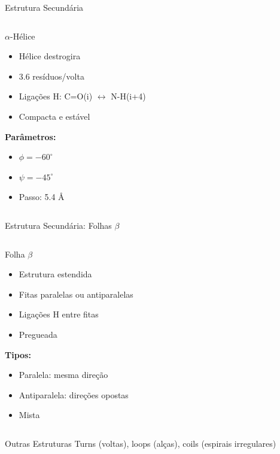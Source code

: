 \begin{frame}[allowframebreaks]{Estrutura Secundária}
\begin{columns}
\begin{block}{$\alpha$-Hélice}
\begin{itemize}
    \item Hélice destrogira
    \item 3.6 resíduos/volta
    \item Ligações H: C=O(i) $\leftrightarrow$ N-H(i+4)
    \item Compacta e estável
\end{itemize}

\textbf{Parâmetros:}
\begin{itemize}
    \item $\phi = -60^{\circ}$
    \item $\psi = -45^{\circ}$
    \item Passo: 5.4 Å
\end{itemize}
\end{block}
\end{columns}
\end{frame}

\begin{frame}[allowframebreaks]{Estrutura Secundária: Folhas $\beta$}
\begin{columns}
\begin{block}{Folha $\beta$}
\begin{itemize}
    \item Estrutura estendida
    \item Fitas paralelas ou antiparalelas
    \item Ligações H entre fitas
    \item Pregueada
\end{itemize}

\textbf{Tipos:}
\begin{itemize}
    \item Paralela: mesma direção
    \item Antiparalela: direções opostas
    \item Mista
\end{itemize}
\end{block}
\end{columns}

\vspace{0.3cm}

\begin{exampleblock}{Outras Estruturas}
Turns (voltas), loops (alças), coils (espirais irregulares)
\end{exampleblock}
\end{frame}

